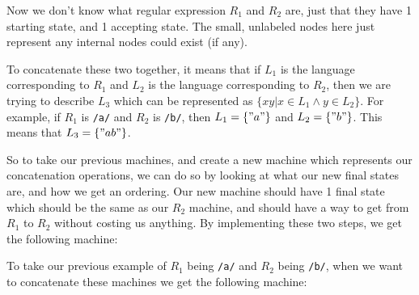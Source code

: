 \documentclass[main.tex]{subfiles}
\begin{document}
Now we don't know what regular expression $R_1$ and $R_2$ are, just that they have 1 starting state, and 1 accepting state. The small, unlabeled nodes here just represent any internal nodes could exist (if any). 

To concatenate these two together, it means that if $L_1$ is the language corresponding to $R_1$ and $L_2$ is the language corresponding to $R_2$, then we are trying to describe $L_3$ which can be represented as $\{xy\vert x \in L_1 \land y \in L_2\}$. For example, if $R_1$ is \texttt{/a/} and $R_2$ is \texttt{/b/}, then $L_1 = \{"a"\}$ and $L_2 = \{"b"\}$. This means that $L_3 = \{"ab"\}$. 

So to take our previous machines, and create a new machine which represents our concatenation operations, we can do so by looking at what our new final states are, and how we get an ordering. Our new machine should have 1 final state which should be the same as our $R_2$ machine, and should have a way to get from $R_1$ to $R_2$ without costing us anything. By implementing these two steps, we get the following machine: 
\begin{center}
\end{center}

To take our previous example of $R_1$ being \texttt{/a/} and $R_2$ being \texttt{/b/}, when we want to concatenate these machines we get the following machine:
\end{document}
